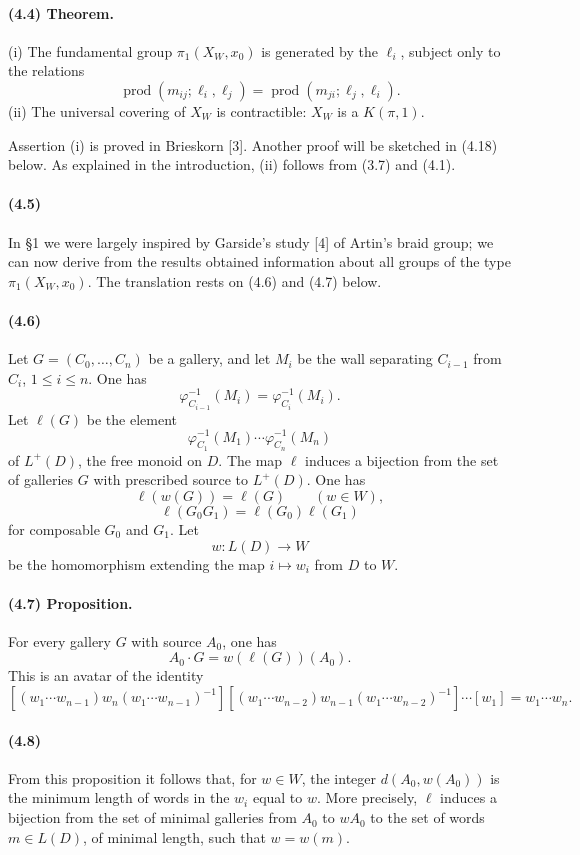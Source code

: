 \documentclass[10pt]{article}
\newcommand{\prodalt}{\operatorname{prod}}
\begin{document}
\paragraph{(4.4) Theorem.} (i) The fundamental group \(\pi_1(X_W,x_0)\) is generated by the \(\ell_i\), subject only to the relations
\[
\tag{4.4.1}
\prodalt(m_{ij};\ell_i,\ell_j)=\prodalt(m_{ji};\ell_j,\ell_i).
\]
(ii) The universal covering of \(X_W\) is contractible: \(X_W\) is a \(K(\pi,1)\).

Assertion (i) is proved in Brieskorn [3]. Another proof will be sketched in (4.18) below. As explained in the introduction, (ii) follows from (3.7) and (4.1).

\paragraph{(4.5)} In §1 we were largely inspired by Garside's study [4] of Artin's braid group; we can now derive from the results obtained information about all groups of the type \(\pi_1(X_W,x_0)\). The translation rests on (4.6) and (4.7) below.

\paragraph{(4.6)} Let \(G=(C_0,\ldots,C_n)\) be a gallery, and let \(M_i\) be the wall separating \(C_{i-1}\) from \(C_i\), \(1\le i\le n\). One has
\[
\varphi^{-1}_{C_{i-1}}(M_i)=\varphi^{-1}_{C_i}(M_i).
\]
Let \(\ell(G)\) be the element
\[
\varphi^{-1}_{C_1}(M_1)\cdots \varphi^{-1}_{C_n}(M_n)
\]
of \(L^+(D)\), the free monoid on \(D\). The map \(\ell\) induces a bijection from the set of galleries \(G\) with prescribed source to \(L^+(D)\). One has
\[
\tag{4.6.1}
\ell(w(G))=\ell(G)\qquad(w\in W),
\]
\[
\tag{4.6.2}
\ell(G_0G_1)=\ell(G_0)\ell(G_1)
\]
for composable \(G_0\) and \(G_1\). Let
\[
w:L(D)\longrightarrow W
\]
be the homomorphism extending the map \(i\mapsto w_i\) from \(D\) to \(W\).

\paragraph{(4.7) Proposition.} For every gallery \(G\) with source \(A_0\), one has
\[
A_0\cdot G=w(\ell(G))(A_0).
\]
This is an avatar of the identity
\[
[(w_1\cdots w_{n-1})w_n(w_1\cdots w_{n-1})^{-1}]
[(w_1\cdots w_{n-2})w_{n-1}(w_1\cdots w_{n-2})^{-1}]
\cdots [w_1]=w_1\cdots w_n.
\]

\paragraph{(4.8)} From this proposition it follows that, for \(w\in W\), the integer \(d(A_0,w(A_0))\) is the minimum length of words in the \(w_i\) equal to \(w\). More precisely, \(\ell\) induces a bijection from the set of minimal galleries from \(A_0\) to \(wA_0\) to the set of words \(m\in L(D)\), of minimal length, such that \(w=w(m)\).
\end{document}
